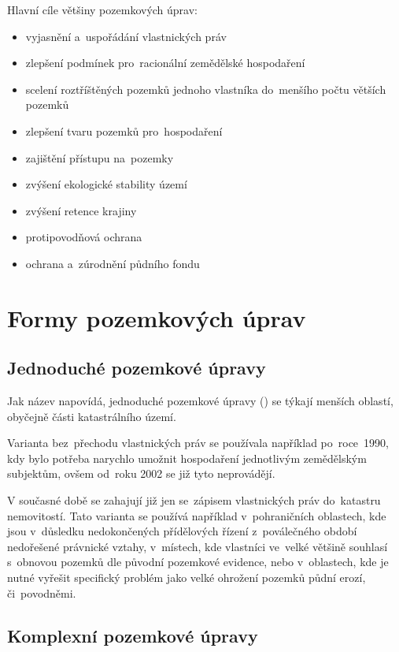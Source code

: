 Hlavní cíle většiny pozemkových úprav:
\vspace{-\topsep}
	\begin{itemize}[leftmargin=1.5cm, noitemsep]
		\item vyjasnění a~uspořádání vlastnických práv
		\item zlepšení podmínek pro~racionální zemědělské hospodaření
		\item scelení roztříštěných pozemků jednoho vlastníka do~menšího počtu větších pozemků
		\item zlepšení tvaru pozemků pro~hospodaření
		\item zajištění přístupu na~pozemky
		\item zvýšení ekologické stability území
		\item zvýšení retence krajiny
		\item protipovodňová ochrana
		\item ochrana a~zúrodnění půdního fondu
	\end{itemize}

\section{Formy pozemkových úprav}
\label{formy_pu}

\subsection{Jednoduché pozemkové úpravy}
\label{jednoduche_pu}

Jak název napovídá, jednoduché pozemkové úpravy () se týkají menších oblastí, obyčejně části katastrálního území.

Varianta  bez~přechodu vlastnických práv se používala například po~ro\-ce~1990, kdy bylo potřeba narychlo umožnit hospodaření jednotlivým zemědělským subjektům, ovšem od~roku 2002 se již tyto  neprovádějí.

V současné době se zahajují již jen  se~zápisem vlastnických práv do~kata\-stru nemovitostí. Tato varianta  se používá například v~pohraničních oblastech, kde jsou v~důsledku nedokončených přídělových řízení z~poválečného období nedořešené právnické vztahy, v~místech, kde vlastníci ve~velké většině souhlasí s~obnovou pozemků dle původní pozemkové evidence, nebo v~oblastech, kde je nutné vyřešit specifický problém jako velké ohrožení pozemků půdní erozí, či~povodněmi.

\subsection{Komplexní pozemkové úpravy}
\label{komplexní_pu}

